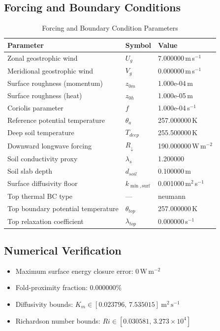 \subsection{Forcing and Boundary Conditions}
\begin{table}[htbp]
\centering
\caption{Forcing and Boundary Condition Parameters}
\label{tab:scm_parameters_sheba_high_top_fd_sheba_250x2m_12h_report}
\begin{tabular}{lll}
\hline
{\bfseries Parameter} & {\bfseries Symbol} & {\bfseries Value} \\
\hline
Zonal geostrophic wind & $U_g$ & 7.000000\,m\,s$^{-1}$ \\
Meridional geostrophic wind & $V_g$ & 0.000000\,m\,s$^{-1}$ \\
Surface roughness (momentum) & $z_{0m}$ & 1.000e-04\,m \\
Surface roughness (heat) & $z_{0h}$ & 1.000e-05\,m \\
Coriolis parameter & $f$ & 1.000e-04\,s$^{-1}$ \\
Reference potential temperature & $\theta_a$ & 257.000000\,K \\
Deep soil temperature & $T_{deep}$ & 255.500000\,K \\
Downward longwave forcing & $R_{\downarrow}$ & 190.000000\,W\,m$^{-2}$ \\
Soil conductivity proxy & $\lambda_s$ & 1.200000 \\
Soil slab depth & $d_{soil}$ & 0.100000\,m \\
Surface diffusivity floor & $k_{\min,\mathrm{surf}}$ & 0.001000\,m$^2$\,s$^{-1}$ \\
Top thermal BC type & --- & neumann \\
Top boundary potential temperature & $\theta_{top}$ & 257.000000\,K \\
Top relaxation coefficient & $\lambda_{top}$ & 0.000000\,s$^{-1}$ \\
\hline
\end{tabular}
\end{table}

\subsection{Numerical Verification}
\begin{itemize}
  \item Maximum surface energy closure error:
  $0\,\mathrm{W\,m^{-2}}$
  \item Fold-proximity fraction:
  $0.000000\%$
  \item Diffusivity bounds:
  $K_m \in [0.023796,\,7.535015]~\mathrm{m^2\,s^{-1}}$
  \item Richardson number bounds:
  $Ri \in [0.030581,\,3.273 \times 10^{4}]$
\end{itemize}

